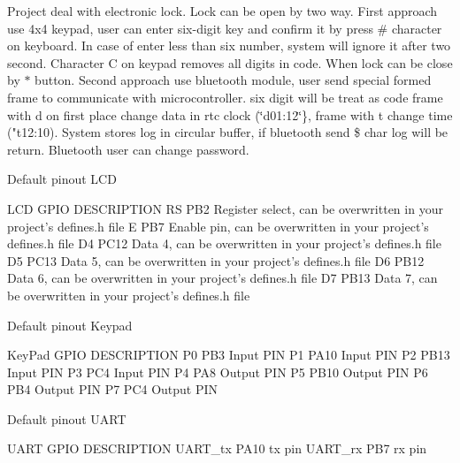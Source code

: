 Project deal with electronic lock. Lock can be open by two way. First approach use 4x4 keypad, user can enter six-\/digit key and confirm it by press \# character on keyboard. In case of enter less than six number, system will ignore it after two second. Character C on keypad removes all digits in code. When lock can be close by $\ast$ button. Second approach use bluetooth module, user send special formed frame to communicate with microcontroller. six digit will be treat as code frame with d on first place change data in rtc clock (\char`\"{}d01\+:12\char`\"{}\}, frame with t change time ("t12\+:10). System stores log in circular buffer, if bluetooth send \$ char log will be return. Bluetooth user can change password.

\begin{DoxyParagraph}{Default pinout L\+CD}

\end{DoxyParagraph}
\begin{DoxyVerb}LCD   GPIO              DESCRIPTION
RS    PB2               Register select, can be overwritten in your project's defines.h file
E     PB7               Enable pin, can be overwritten in your project's defines.h file
D4    PC12              Data 4, can be overwritten in your project's defines.h file
D5    PC13              Data 5, can be overwritten in your project's defines.h file
D6    PB12              Data 6, can be overwritten in your project's defines.h file
D7    PB13              Data 7, can be overwritten in your project's defines.h file\end{DoxyVerb}


\begin{DoxyParagraph}{Default pinout Keypad}

\end{DoxyParagraph}
\begin{DoxyVerb}KeyPad   GPIO             DESCRIPTION
P0       PB3              Input PIN
P1       PA10             Input PIN
P2       PB13             Input PIN
P3       PC4              Input PIN
P4       PA8              Output PIN
P5       PB10             Output PIN
P6       PB4              Output PIN
P7       PC4              Output PIN\end{DoxyVerb}


\begin{DoxyParagraph}{Default pinout U\+A\+RT}

\end{DoxyParagraph}
\begin{DoxyVerb}UART      GPIO          DESCRIPTION
UART_tx   PA10           tx pin
UART_rx   PB7            rx pin\end{DoxyVerb}
 